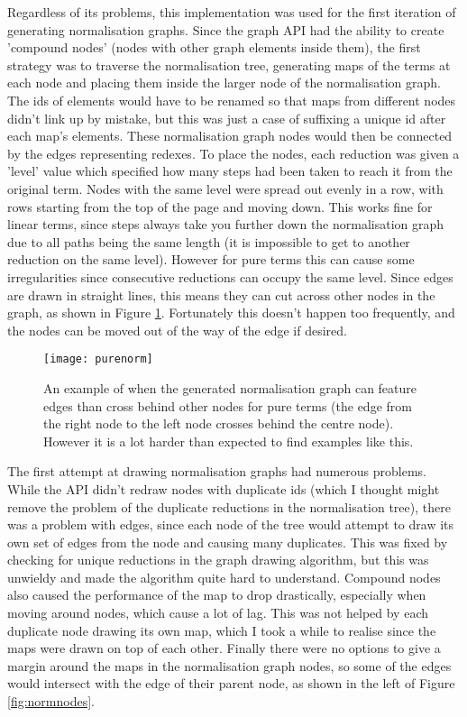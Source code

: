 \documentclass[11pt]{article}
\begin{document}
Regardless of its problems, this implementation was used for the first iteration of generating normalisation graphs. Since the graph API had the ability to create 'compound nodes' (nodes with other graph elements inside them), the first strategy was to traverse the normalisation tree, generating maps of the terms at each node and placing them inside the larger node of the normalisation graph. The ids of elements would have to be renamed so that maps from different nodes didn't link up by mistake, but this was just a case of suffixing a unique id after each map's elements. These normalisation graph nodes would then be connected by the edges representing redexes. To place the nodes, each reduction was given a 'level' value which specified how many steps had been taken to reach it from the original term. Nodes with the same level were spread out evenly in a row, with rows starting from the top of the page and moving down. This works fine for linear terms, since steps always take you further down the normalisation graph due to all paths being the same length (it is impossible to get to another reduction on the same level). However for pure terms this can cause some irregularities since consecutive reductions can occupy the same level. Since edges are drawn in straight lines, this means they can cut across other nodes in the graph, as shown in Figure \ref{fig:purenorm}. Fortunately this doesn't happen too frequently, and the nodes can be moved out of the way of the edge if desired.

\begin{figure}
    \centering
    \texttt{[image: purenorm]}
    \caption{An example of when the generated normalisation graph can feature edges than cross behind other nodes for pure terms (the edge from the right node to the left node crosses behind the centre node). However it is a lot harder than expected to find examples like this.}
    \label{fig:purenorm}
\end{figure}

The first attempt at drawing normalisation graphs had numerous problems. While the API didn't redraw nodes with duplicate ids (which I thought might remove the problem of the duplicate reductions in the normalisation tree), there was a problem with edges, since each node of the tree would attempt to draw its own set of edges from the node and causing many duplicates. This was fixed by checking for unique reductions in the graph drawing algorithm, but this was unwieldy and made the algorithm quite hard to understand. Compound nodes also caused the performance of the map to drop drastically, especially when moving around nodes, which cause a lot of lag. This was not helped by each duplicate node drawing its own map, which I took a while to realise since the maps were drawn on top of each other. Finally there were no options to give a margin around the maps in the normalisation graph nodes, so some of the edges would intersect with the edge of their parent node, as shown in the left of Figure \ref{fig:normnodes}.
\end{document}
